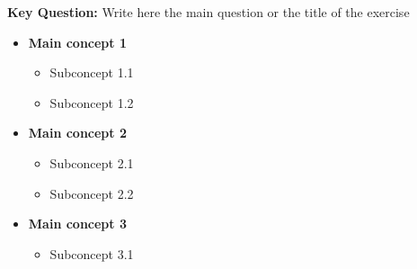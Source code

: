 
\begin{cascade}
	\textbf{Key Question:} Write here the main question or the title of the exercise

	\begin{itemize}
		\item \textbf{Main concept 1}
		      \begin{itemize}
			      \item Subconcept 1.1
			      \item Subconcept 1.2
		      \end{itemize}
		\item \textbf{Main concept 2}
		      \begin{itemize}
			      \item Subconcept 2.1
			      \item Subconcept 2.2
		      \end{itemize}
		\item \textbf{Main concept 3}
		      \begin{itemize}
			      \item Subconcept 3.1
		      \end{itemize}
	\end{itemize}


\end{cascade}
